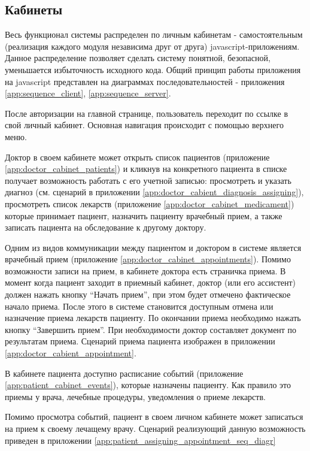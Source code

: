 \subsection{Кабинеты}
Весь функционал системы распределен по личным кабинетам - самостоятельным
(реализация каждого модуля независима друг от друга) javascript-приложениям.
Данное распределение позволяет сделать систему понятной, безопасной, уменьшается
избыточность исходного кода. Общий принцип работы приложения на javascript
представлен на диаграммах последовательностей - приложения 
\ref{app:sequence_client}, \ref{app:sequence_server}.

После авторизации на главной странице, пользователь переходит по ссылке в свой
личный кабинет. Основная навигация происходит с помощью верхнего меню.

Доктор в своем кабинете может открыть список пациентов (приложение
\ref{app:doctor_cabinet_patients}) и кликнув на конкретного пациента в списке
получает возможность работать с его учетной записью:
просмотреть и указать диагноз (см. сценарий в приложении
\ref{app:doctor_cabient_diagnosis_assigning}), просмотреть список лекарств (приложение \ref{app:doctor_cabinet_medicament}) которые принимает пациент, назначить
пациенту врачебный прием, а также записать пациента на обследование к другому
доктору.

Одним из видов коммуникации между пациентом и доктором в системе является
врачебный прием (приложение \ref{app:doctor_cabinet_appointments}). Помимо
возможности записи на прием, в кабинете доктора есть страничка приема. В момент
когда пациент заходит в приемный кабинет, доктор (или его ассистент) должен
нажать кнопку “Начать прием”, при этом будет отмечено фактическое начало приема.
После этого в системе становится доступным отмена или назначение приема лекарств
пациенту. По окончании приема необходимо нажать кнопку “Завершить прием”. При
необходимости доктор составляет документ по результатам приема.
Сценарий приема пациента изображен в приложении
\ref{app:doctor_cabient_appointment}.

В кабинете пациента доступно расписание событий (приложение
\ref{app:patient_cabinet_events}), которые назначены пациенту.
Как правило это приемы у врача, лечебные процедуры, уведомления о приеме
лекарств.

Помимо просмотра событий, пациент в своем личном кабинете может записаться на
прием к своему лечащему врачу. Сценарий реализующий данную возможность приведен
в приложении \ref{app:patient_assigning_appointment_seq_diagr}

